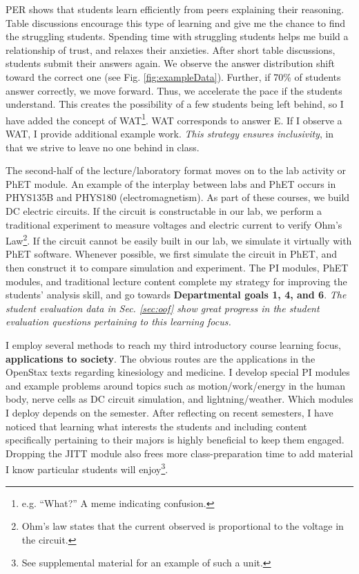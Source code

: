 \documentclass[../../../main.tex]{subfiles}
\begin{document}
PER shows that students learn efficiently from peers explaining their reasoning.  Table discussions encourage this type of learning and  give me the chance to find the struggling students. Spending time with struggling students helps me build a relationship of trust, and relaxes their anxieties.  After short table discussions, students submit their answers again.  We observe the answer distribution shift toward the correct one (see Fig. \ref{fig:exampleData}).  Further, if 70\% of students answer correctly, we move forward.  Thus, we accelerate the pace if the students understand.  This creates the possibility of a few students being left behind, so I have added the concept of WAT\footnote{e.g. ``What?'' A meme indicating confusion.}.  WAT corresponds to answer E.  If I observe a WAT, I provide additional example work.  \textit{This strategy ensures inclusivity}, in that we strive to leave no one behind in class.  \\ \hspace{0.1cm}

The second-half of the lecture/laboratory format moves on to the lab activity or PhET module.  An example of the interplay between  labs and PhET occurs in PHYS135B and PHYS180 (electromagnetism).  As part of these courses, we build DC electric circuits.  If the circuit is constructable in our lab, we perform a traditional experiment to measure voltages and electric current to verify Ohm's Law\footnote{Ohm's law states that the current observed is proportional to the voltage in the circuit.}.  If the circuit cannot be easily built in our lab, we simulate it virtually with PhET software.  Whenever possible, we first simulate the circuit in PhET, and then construct it to compare simulation and experiment.  The PI modules, PhET modules, and traditional lecture content complete my strategy for improving the students' analysis skill, and go towards \textbf{Departmental goals 1, 4, and 6}.  \textit{The student evaluation data in Sec. \ref{sec:oof} show great progress in the student evaluation questions pertaining to this learning focus.} \\ \hspace{0.1cm}

I employ several methods to reach my third introductory course learning focus, \textbf{applications to society}.  The obvious routes are the applications in the OpenStax texts \cite{openstax1} regarding kinesiology and medicine.  I develop special PI modules and example problems around topics such as motion/work/energy in the human body, nerve cells as DC circuit simulation, and lightning/weather.  Which modules I deploy depends on the semester.  After reflecting on recent semesters, I have noticed that learning what interests the students and including content specifically pertaining to their majors is highly beneficial to keep them engaged.  Dropping the JITT module also frees more class-preparation time to add material I know particular students will enjoy\footnote{See supplemental material for an example of such a unit.}. \\ \hspace{0.1cm}
\end{document}
